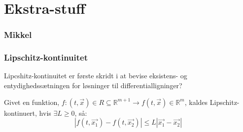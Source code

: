 \chapter{Ekstra-stuff}

\subsection{Mikkel}

\subsection{Lipschitz-kontinuitet}
Lipcshitz-kontinuitet er første skridt i at bevise eksistens- og entydighedssætningen for løsninger til differentialligninger?
\begin{definition}
Givet en funktion, $f: (t,\vec{x})\in R \subseteq \mathbb{R}^{m+1} \rightarrow f(t,\vec{x}) \in \mathbb{R}^m$, kaldes Lipschitz-kontinuert, hvis $\exists L \geq 0$, så:
$$|f(t,\vec{x_1})-f(t,\vec{x_2})|\leq L|\vec{x_1}-\vec{x_2}|$$
\end{definition}

